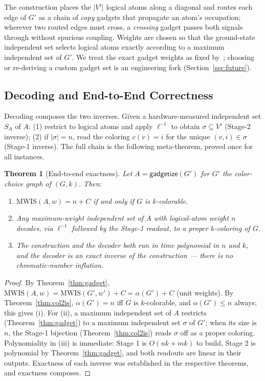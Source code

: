 \documentclass[11pt]{article}
\newtheorem{theorem}{Theorem}[section]
\theoremstyle{definition}
\theoremstyle{remark}
\newcommand{\MWIS}{\mathrm{MWIS}}
\newcommand{\indep}{\alpha}
\begin{document}
The construction places the $|V'|$ logical atoms along a diagonal and routes each edge
of $G'$ as a chain of \emph{copy} gadgets that propagate an atom's occupation;
wherever two routed edges must cross, a \emph{crossing} gadget passes both signals
through without spurious coupling. Weights are chosen so that the ground-state
independent set selects logical atoms exactly according to a maximum independent set of
$G'$. We treat the exact gadget weights as fixed by~\cite{Nguyen2023}; choosing or
re-deriving a custom gadget set is an engineering fork (Section~\ref{sec:future}).

\subsection{Decoding and End-to-End Correctness}
\label{sec:decode}

Decoding composes the two inverses. Given a hardware-measured independent set $S_A$ of
$A$: (1) restrict to logical atoms and apply $\ell^{-1}$ to obtain $\sigma\subseteq V'$
(Stage-2 inverse); (2) if $|\sigma|=n$, read the coloring $c(v)=i$ for the unique
$(v,i)\in\sigma$ (Stage-1 inverse). The full chain is the following meta-theorem,
proved once for all instances.

\begin{theorem}[End-to-end exactness]
\label{thm:endtoend}
Let $A=\mathsf{gadgetize}(G')$ for $G'$ the color-choice graph of $(G,k)$. Then:
\begin{enumerate}[label=(\roman*),leftmargin=2.2em]
  \item $\MWIS(A,w) = n + C$ if and only if $G$ is $k$-colorable.
  \item Any maximum-weight independent set of $A$ with logical-atom weight $n$
        decodes, via $\ell^{-1}$ followed by the Stage-1 readout, to a proper
        $k$-coloring of $G$.
  \item The construction and the decoder both run in time polynomial in $n$ and $k$,
        and the decoder is an exact inverse of the construction --- there is no
        chromatic-number inflation.
\end{enumerate}
\end{theorem}

\begin{proof}
By Theorem~\ref{thm:gadget}, $\MWIS(A,w)=\MWIS(G',w')+C=\indep(G')+C$ (unit weights).
By Theorem~\ref{thm:col2is}, $\indep(G')=n$ iff $G$ is $k$-colorable, and
$\indep(G')\le n$ always; this gives (i). For (ii), a maximum independent set of $A$
restricts (Theorem~\ref{thm:gadget}) to a maximum independent set $\sigma$ of $G'$;
when its size is $n$, the Stage-1 bijection (Theorem~\ref{thm:col2is}) reads $\sigma$
off as a proper coloring. Polynomiality in (iii) is immediate: Stage 1 is $O(nk+mk)$ to
build, Stage 2 is polynomial by Theorem~\ref{thm:gadget}, and both readouts are linear
in their outputs. Exactness of each inverse was established in the respective theorems,
and exactness composes.
\end{proof}
\end{document}
